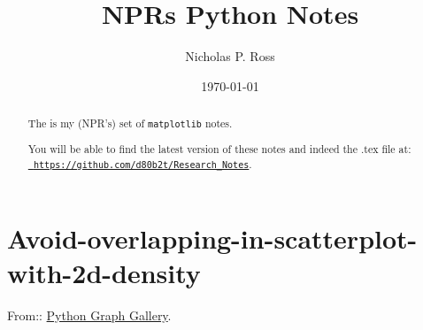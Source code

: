 \documentclass[11pt,a4paper]{article}
\begin{document}
\title{NPRs Python Notes}
\author{Nicholas P. Ross}
\date{\today}
\maketitle




\begin{abstract}
The is my (NPR's) set of {\tt matplotlib} notes.  

You will be able to find the latest version of these notes
and indeed the .tex file at:\\
\href{https://github.com/d80b2t/Research\_Notes}{\tt
https://github.com/d80b2t/Research\_Notes}.
\end{abstract}


\section{Avoid-overlapping-in-scatterplot-with-2d-density}
From::
\href{https://python-graph-gallery.com/86-avoid-overlapping-in-scatterplot-with-2d-density/}{Python
Graph Gallery}.
\end{document}
